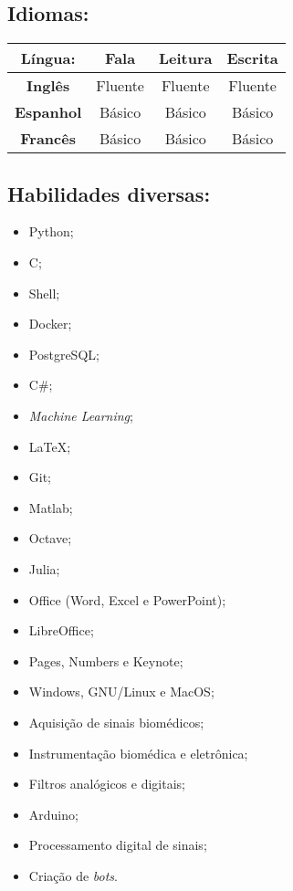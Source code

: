 \documentclass[11pt]{article}
\begin{document}
\subsection{Idiomas:}
\begin{center}
\begin{tabular}{c | c | c | c}
\hline
\textbf{Língua:} & Fala & Leitura & Escrita \\
\hline
\hline
\textbf{Inglês} &  Fluente & Fluente & Fluente  \\
\hline
\textbf{Espanhol} & Básico & Básico & Básico \\
\hline
\textbf{Francês} & Básico & Básico & Básico \\
\hline
\end{tabular}
\end{center}

\newpage
\subsection{Habilidades diversas:}

\begin{multicols}{3} %
\begin{itemize}
    \item Python;
    \item C;
    \item Shell;
    \item Docker;
    \item PostgreSQL;
    \item C\#;
    \item \textit{Machine Learning};
    \item \LaTeX ;
    \item Git;
    \item Matlab;
    \item Octave;
    \item Julia;
    \item Office (Word, Excel e PowerPoint);
    \item LibreOffice;
    \item Pages, Numbers e Keynote;
    \item Windows, GNU/Linux e MacOS;
    \item Aquisição de sinais biomédicos;
    \item Instrumentação biomédica e eletrônica;
    \item Filtros analógicos e digitais;
    \item Arduino;
    \item Processamento digital de sinais;
    \item Criação de \textit{bots}.
\end{itemize}
\end{multicols}
\end{document}
